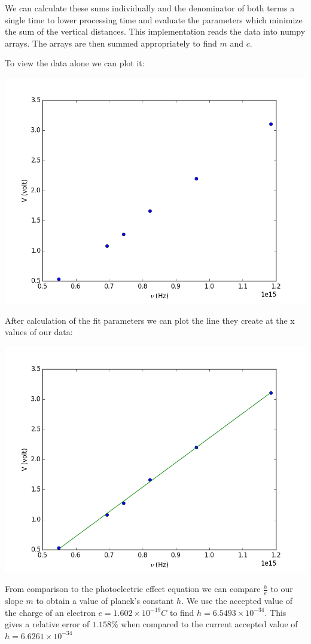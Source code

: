 \documentclass[12pt]{article}
\begin{document}
We can calculate these sums individually and the denominator of both terms a single time to lower processing time and evaluate the parameters which minimize the sum of the vertical distances.  This implementation reads the data into numpy arrays.  The arrays are then summed appropriately to find $m$ and $c$.

To view the data alone we can plot it:

\includegraphics[scale=.8]{reg_a.png}

After calculation of the fit parameters we can plot the line they create at the x values of our data:

\includegraphics[scale=.8]{reg.png}

From comparison to the photoelectric effect equation we can compare $\frac{h}{e}$ to our slope $m$ to obtain a value of planck's constant $h$.  We use the accepted value of the charge of an electron $e = 1.602 \times 10^{-19} C$ to find $h = 6.5493 \times 10^{-34}$.  This gives a relative error of $1.158\%$ when compared to the current accepted value of $h = 6.6261\times 10^{-34}$
\end{document}
